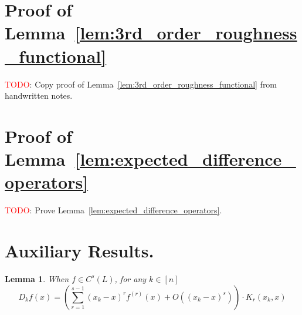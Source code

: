 \documentclass{article}
\newcommand{\1}{\mathbf{1}}
\theoremstyle{alden}
\theoremstyle{aldenthm}
\newtheorem{lemma}{Lemma}
\theoremstyle{definition}
\theoremstyle{remark}
\begin{document}
\section{Proof of Lemma~\ref{lem:3rd_order_roughness_functional}}

\textcolor{red}{TODO}: Copy proof of Lemma~\ref{lem:3rd_order_roughness_functional} from handwritten notes.

\section{Proof of Lemma~\ref{lem:expected_difference_operators}}

\textcolor{red}{TODO}: Prove Lemma~\ref{lem:expected_difference_operators}.


\section{Auxiliary Results.}
\begin{lemma}
	\label{lem:difference_operator_taylor}
	When $f \in C^s(L)$, for any $k \in [n]$ 
	\begin{equation*}
	D_kf(x) = \left(\sum_{r = 1}^{s - 1} (x_k - x)^r f^{(r)}(x) + O((x_k - x)^{s})\right) \cdot K_r(x_k,x)
	\end{equation*}
\end{lemma}
\end{document}
